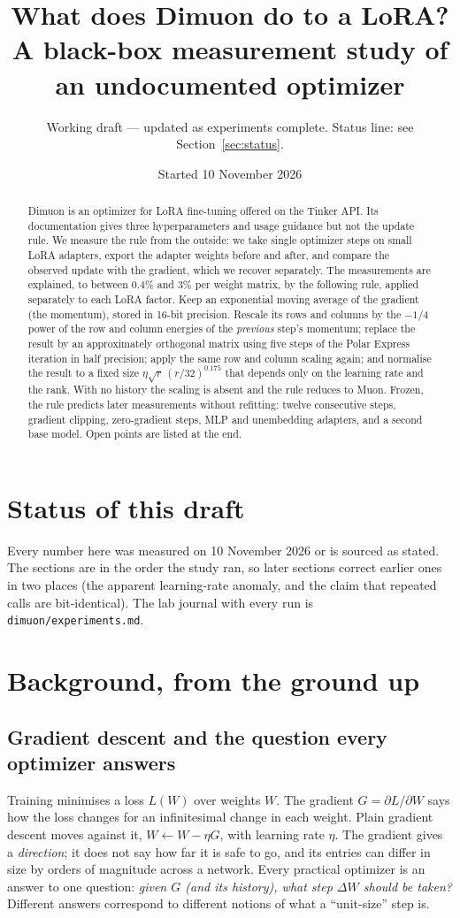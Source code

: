 \documentclass[11pt]{article}
\title{What does Dimuon do to a LoRA?\\ \large A black-box measurement study of an undocumented optimizer}
\author{Working draft --- updated as experiments complete. Status line: see Section~\ref{sec:status}.}
\date{Started 10 November 2026}
\begin{document}
\maketitle

\begin{abstract}
Dimuon is an optimizer for LoRA fine-tuning offered on the Tinker API. Its documentation gives
three hyperparameters and usage guidance but not the update rule. We measure the rule from the
outside: we take single optimizer steps on small LoRA adapters, export the adapter weights before
and after, and compare the observed update with the gradient, which we recover separately.
The measurements are explained, to between 0.4\% and 3\% per weight matrix, by the following
rule, applied separately to each LoRA factor. Keep an exponential moving average of the
gradient (the momentum), stored in 16-bit precision. Rescale its rows and columns by the
$-1/4$ power of the row and column energies of the \emph{previous} step's momentum; replace the
result by an approximately orthogonal matrix using five steps of the Polar Express iteration in
half precision; apply the same row and column scaling again; and normalise the result to a
fixed size $\eta\sqrt r\,(r/32)^{0.175}$ that depends only on the learning rate and the rank.
With no history the scaling is absent and the rule reduces to Muon. Frozen, the rule predicts
later measurements without refitting: twelve consecutive steps, gradient clipping, zero-gradient
steps, MLP and unembedding adapters, and a second base model. Open points are listed at the end.
\end{abstract}

\section{Status of this draft}\label{sec:status}
Every number here was measured on 10 November 2026 or is sourced as stated. The sections are in
the order the study ran, so later sections correct earlier ones in two places (the apparent
learning-rate anomaly, and the claim that repeated calls are bit-identical). The lab journal
with every run is \texttt{dimuon/experiments.md}.

\section{Background, from the ground up}

\subsection{Gradient descent and the question every optimizer answers}
Training minimises a loss $L(W)$ over weights $W$. The gradient $G=\partial L/\partial W$ says how
the loss changes for an infinitesimal change in each weight. Plain gradient descent moves against
it, $W \leftarrow W-\eta G$, with learning rate $\eta$. The gradient gives a \emph{direction}; it
does not say how far it is safe to go, and its entries can differ in size by orders of magnitude
across a network. Every practical optimizer is an answer to one question: \emph{given $G$ (and its
history), what step $\Delta W$ should be taken?} Different answers correspond to different notions
of what a ``unit-size'' step is.
\end{document}
